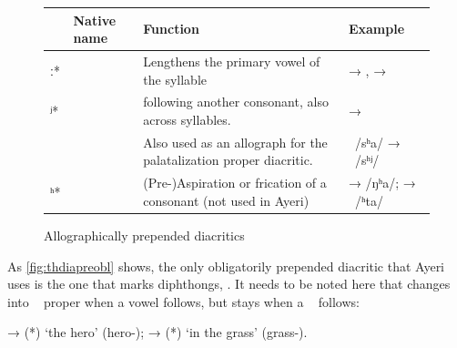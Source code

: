 
\begin{figure}[tp]
\caption{Allographically prepended diacritics}
\begin{tabu} to 
\toprule
\tableheaderfont

	& Native name
	& Function
	& Example
	\\
	
\toprule

ː*
	& 
	& Lengthens the primary vowel of the syllable
	&  → ,\newline
		 → 
	\\
	
\midrule

ʲ*
	& 
	&  following another consonant, also across syllables.
	&  → 
	\\
	
	
	& 
	& Also used as an allograph for the palatalization proper diacritic.
	& ~/sʰa/ → ~/sʰʲ/
	\\
	
\midrule

ʰ*
	& 
	& (Pre-)Aspiration or frication of a consonant (not used in Ayeri)
	&  →  /ŋʰa/;\newline
		 → ~/ʰta/
	\\

\bottomrule
\end{tabu}
\label{fig:thdiapreallo}
\end{figure}

As \autoref{fig:thdiapreobl} shows, the only obligatorily prepended diacritic 
that Ayeri uses is the one that marks diphthongs, . 
It needs to be noted here that  changes into ~ proper 
when a vowel follows, but stays  when a ~ follows:

\pex
	\a {} → 
		 (*) 
		`the hero' (hero-\Aarg{});
	\a {} → 
		 (*)  `in 
		the grass' (grass-\Loc{}).
\xe

